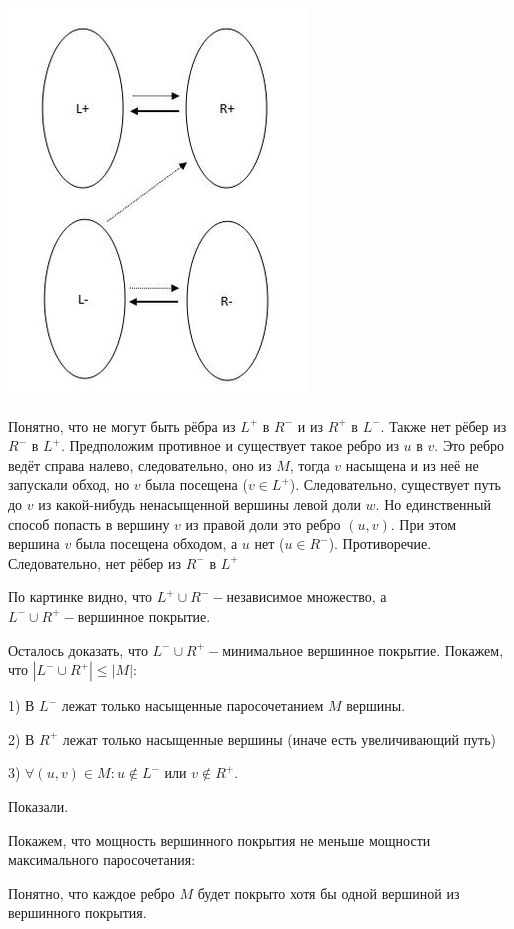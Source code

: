 \includegraphics[scale=0.5]{images/63-71_пути2}

Понятно, что не могут быть рёбра из $L^+$ в $R^-$ и из $R^+$ в $L^-$. Также нет рёбер из $R^-$ в $L^+$. Предположим противное и существует такое ребро из $u$ в $v$. Это ребро ведёт справа налево, следовательно, оно из $M$, тогда $v$ насыщена и из неё не запускали обход, но $v$ была посещена ($v \in L^+$). Следовательно, существует путь до $v$ из какой-нибудь ненасыщенной вершины левой доли $w$. Но единственный способ попасть в вершину $v$ из правой доли это ребро $(u, v)$. При этом вершина $v$ была посещена обходом, а $u$ нет ($u \in R^-$). Противоречие. Следовательно, нет рёбер из $R^-$ в $L^+$  

По картинке видно, что $L^+ \cup R^- - \text{независимое множество}$, а $L^- \cup R^+ - \text{вершинное покрытие}$.

Осталось доказать, что $L^- \cup R^+ - \text{минимальное вершинное покрытие}$. Покажем, что $|L^- \cup R^+| \leq |M|$:

1) В $L^-$ лежат только насыщенные паросочетанием $M$ вершины.

2) В $R^+$ лежат только насыщенные вершины (иначе есть увеличивающий путь)

3) $\forall (u, v) \in M: u \not \in L^-$ или $v \not \in R^+$.

Показали.

Покажем, что мощность вершинного покрытия не меньше мощности максимального паросочетания:

Понятно, что каждое ребро $M$ будет покрыто хотя бы одной вершиной из вершинного покрытия.

